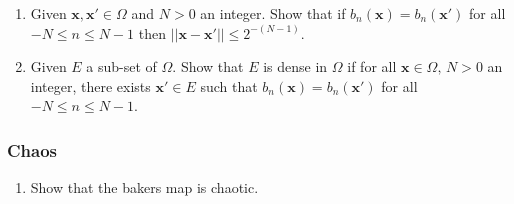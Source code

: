 \documentclass{article}
\begin{document}
\begin{question}
   \begin{enumerate}[label=(\alph*),resume] 
     \item Given $\bm x,\bm x' \in \Omega$ and $N> 0$ an integer. Show that if $b_n(\bm x) = b_n(\bm x')$ for all $-N \leqslant n \leqslant N-1$ then $||\bm x - \bm x'|| \leqslant 2^{-(N-1)}$.
     \item Given $E$ a sub-set of $\Omega$. Show that $E$ is dense in $\Omega$ if for all $\bm x\in \Omega,\,N>0$ an integer, there exists $\bm x'\in E$ such that $b_n(\bm x) = b_n(\bm x')$ for all $-N \leqslant n \leqslant N-1$.
   \end{enumerate}
   
   \subsubsection*{Chaos}

   \begin{enumerate}[label=(\alph*),resume] 
    \item Show that the bakers map is chaotic.
   \end{enumerate}

\end{question}

 
\end{document}
